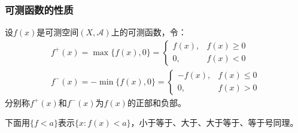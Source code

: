 \subsubsection{可测函数的性质}
\begin{definition}
	设$f(x)$是可测空间$(X,\mathscr{A})$上的可测函数，令：
	\begin{gather*}
		f^+(x)=\max\{f(x),0\}=
		\begin{cases}
			f(x),&f(x)\geqslant 0 \\
			0,&f(x)<0
		\end{cases} \\
		f^-(x)=-\min\{f(x),0\}=
		\begin{cases}
			-f(x),&f(x)\leqslant 0 \\
			0,&f(x)>0
		\end{cases}
	\end{gather*}
	分别称$f^+(x)$和$f^-(x)$为$f(x)$的正部和负部。
\end{definition}
下面用$\{f<a\}$表示$\{x:f(x)<a\}$，小于等于、大于、大于等于、等于号同理。
